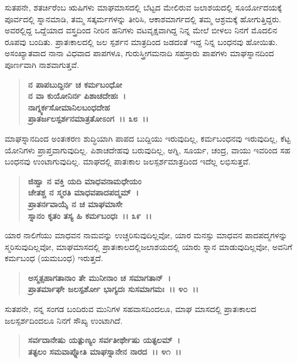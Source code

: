 ಸುತಪನೇ, ಶತರ್ಚಿರೆಂಬ ಋಷಿಗಳು ಮಾಘಮಾಸದಲ್ಲಿ ಬೆಟ್ಟದ ಮೇಲಿರುವ ಜಲಾಶಯದಲ್ಲಿ ಸೂರ್ಯೋದಯಕ್ಕೆ ಪೂರ್ವದಲ್ಲಿ ಸ್ನಾನಮಾಡಿ, ತಮ್ಮ ಸತ್ಕರ್ಮಗಳನ್ನು ತೀರಿಸಿ, ಆಕಾಶಮಾರ್ಗದಲ್ಲಿ ತಮ್ಮ ಆಶ್ರಮಕ್ಕೆ ಹೋಗುತ್ತಿದ್ದರು. ಅವರಲ್ಲಿದ್ದ ಒದ್ದೆಯಾದ ವಸ್ತ್ರದಿಂದ ನೀರಿನ ಹನಿಗಳು ವಟವೃಕ್ಷವಾಗಿದ್ದ ನಿನ್ನ ಮೇಲೆ ಬೀಳಲು ನಿನಗೆ ಮೊದಲಿನ ರೂಪವು ಬಂದಿತು. ಪ್ರಾತಃಕಾಲದಲ್ಲಿ ಜಲ ಸ್ಪರ್ಶನ ಮಾತ್ರದಿಂದ ಜಡದಂತೆ ಇದ್ದ ನಿನ್ನ ಬಂಧನವು ಹೋಯಿತು. ಅಸಂಖ್ಯಾತವಾದ ನಾನಾ ವಿಧವಾದ ಪಾಪಗಳೂ, ಗುರುಸ್ತ್ರೀಗಮನಾದಿ ಸಹಸ್ರಾರು ಪಾಪಗಳು ಮಾಘಸ್ನಾನದಿಂದ ಪೂರ್ಣವಾಗಿ ನಾಶವಾಗುತ್ತವೆ.

\begin{verse}
\textbf{ನ ಪಾಪಬುದ್ದಿರ್ನ ಚ ಕರ್ಮಬಂಧೋ}\\\textbf{ನ ವಾ ಕುಯೋನಿರ್ನ ಪಿಶಾಚದೇಹಃ~। }\\\textbf{ನಾಗ್ನ್ಯರ್ಕಸೋಮಾನಿಲಬಂಧದೇಹ} \\\textbf{ಪ್ರಾತರ್ಜಲಸ್ಪರ್ಶನಮಾತ್ರತೋಽಂಗ~।। ೩೮~।।}
\end{verse}

ಮಾಘಸ್ನಾನದಿಂದ ಅಂತಃಕರಣ ಶುದ್ಧಿಯಾಗಿ ಪಾಪದ ಬುದ್ದಿಯು ಇರುವುದಿಲ್ಲ, ಕರ್ಮಬಂಧನವು ಇರುವುದಿಲ್ಲ, ಕೆಟ್ಟ ಯೋನಿಗಳು ಪ್ರಾಪ್ತವಾಗುವುದಿಲ್ಲ. ಪಿಶಾಚದೇಹವು ಬರುವುದಿಲ್ಲ, ಅಗ್ನಿ, ಸೂರ್ಯ, ಚಂದ್ರ, ವಾಯು ಇವರಿಂದ ಸಹ ಬಂಧನವು ಉಂಟಾಗುವುದಿಲ್ಲ. ಮಾಘದಲ್ಲಿ ಪಾತಃಕಾಲ ಜಲಸ್ಪರ್ಶಮಾತ್ರದಿಂದ ಇದೆಲ್ಲ ಲಭಿಸುತ್ತವೆ.

\begin{verse}
\textbf{ಜಿಹ್ವಾ ನ ವಕ್ತಿ ಯದಿ ಮಾಧವನಾಮಧೇಯಂ}\\\textbf{ಚೇತಶ್ಚ ನ ಸ್ಮರತಿ ಮಾಧವಪಾದಪದ್ಮಮ್~। }\\\textbf{ಪ್ರಾತರ್ನವಾಯೈ ನ ಚ ಮಾಘಮಾಸೇ} \\\textbf{ಸ್ನಾನಂ ಕೃತಂ ತಸ್ಯ ಹಿ ಕರ್ಮಬಂಧಃ~।। ೩೯~।।}
\end{verse}

ಯಾರ ನಾಲಿಗೆಯು ಮಾಧವನ ನಾಮವನ್ನು ಉಚ್ಚರಿಸುವುದಿಲ್ಲವೋ, ಯಾರ ಮನಸ್ಸು ಮಾಧವನ ಪಾದಪದ್ಮಗಳನ್ನು ಸ್ಮರಿಸುವುದಿಲ್ಲವೋ, ಮಾಘಮಾಸದಲ್ಲಿ ಪ್ರಾತಃಕಾಲದಲ್ಲಿ\break ಜಲಾಶಯದಲ್ಲಿ ಯಾರು ಸ್ನಾನ ಮಾಡುವುದಿಲ್ಲವೋ, ಅವನಿಗೆ ಕರ್ಮಬಂಧ (ಯಮಬಂಧ) ಇರುತ್ತದೆ.

\begin{verse}
\textbf{ಅಸ್ಮತ್ಸಹಾಗತಾನಾಂ ತೇ ಮುನೀನಾಂ ಚ ಸಮಾಗತಾನ್~।}\\\textbf{ಪ್ರಾತರ್ಮಾಘೇ ಜಲಸ್ಪರ್ಶೋ ಭಾಗ್ಯದಃ ಸುಸಮಾಗಮಃ~।। ೪೦~।।}
\end{verse}

ಸುತಪನೇ, ನನ್ನ ಸಂಗಡ ಬಂದಿರುವ ಮುನಿಗಳ ಸಹವಾಸದಿಂದಲೂ, ಮಾಘ ಮಾಸದಲ್ಲಿ ಪ್ರಾತಃಕಾಲದ ಜಲಸ್ಪರ್ಶದಿಂದಲೂ ನಿನಗೆ ಸೌಖ್ಯ ಉಂಟಾಗಿದೆ.

\begin{verse}
\textbf{ಸರ್ವದಾನೇಷು ಯತ್ಪುಣ್ಯಂ ಸರ್ವತೀರ್ಥೇಷು ಯತ್ಫಲಮ್~।}\\\textbf{ತತ್ಫಲಂ ಸಮವಾಪ್ನೋತಿ ಮಾಘಸ್ನಾನೇನ ನಾರದ~।। ೪೧~।। }
\end{verse}

